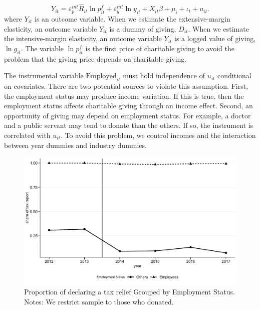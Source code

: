 \documentclass[
  11pt,
  a4paper,
]{article}
\begin{document}
\begin{equation}
    Y_{it} = \varepsilon^{int}_p \hat{R}_{it} \ln p^f_{it} + \varepsilon^{int}_y \ln y_{it} 
    + X_{it}\beta +\mu_i +\iota_t +u_{it}. \label{eq:stage2}
\end{equation}
where \(Y_{it}\) is an outcome variable.
When we estimate the extensive-margin elasticity,
an outcome variable \(Y_{it}\) is a dummy of giving, \(D_{it}\).
When we estimate the intensive-margin elasticity,
an outcome variable \(Y_{it}\) is a logged value of giving, \(\ln g_{it}\).
The variable \(\ln p^f_{it}\) is the first price of charitable giving
to avoid the problem that the giving price depends on charitable giving.

The instrumental variable \(\text{Employed}_{it}\) must hold independence of \(u_{it}\) conditional on covariates.
There are two potential sources to violate this assumption.
First, the employment status may produce income variation.
If this is true, then the employment status affects charitable giving through an income effect.
Second, an opportunity of giving may depend on employment status.
For example, a doctor and a public servant may tend to donate than the others.
If so, the instrument is correlated with \(u_{it}\).
To avoid this problem, we control incomes and the interaction between year dummies and industry dummies.

\begin{figure}[t]

{\centering \includegraphics{draft_files/figure-latex/DeductByEmployee-1} 

}

\caption{Proportion of declaring a tax relief Grouped by Employment Status. Notes: We restrict sample to those who donated.}\label{fig:DeductByEmployee}
\end{figure}
\end{document}
